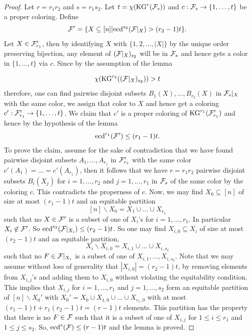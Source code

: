 \documentclass[a4paper,11pt]{article}
\begin{document}
\begin{proof} Let $r=r_1r_2$ and $s=r_1s_2$. Let $t=\chi(\mbox{KG}^r({\cal F}_s))$ and $c:{\cal F}_s\rightarrow \{1,\dots, t\}$ be a proper coloring. Define
$${\cal F}'=\{X\subseteq [n]| \mbox{ecd}^{s_2}({\cal F}|_X)>(r_2-1)t\}.$$
 Let $X\in {\cal F}'_{r_1}$, then by identifying $X$ with $\{1,2,\dots, |X|\}$ by the unique order preserving bijection, any element of $({\cal F}|_X)_{s_2}$ will be in ${\cal F}_s$ and hence gets a color in $\{1,\dots, t\}$ via $c$. Since by the assumption of the lemma

$$\chi(\mbox{KG}^{r_2}(({\cal F}|_X)_{s_2}))>t$$
therefore, one can find pairwise disjoint subsets $B_1(X),\dots, B_{r_2}(X)$ in ${\cal F}_s|_X$ with the same color, we assign that color to $X$ and hence get a coloring $c':{\cal F}'_{r_1}\rightarrow \{1,\dots, t\}$. We claim that $c'$ is a proper coloring of $\mbox{KG}^{r_1}({\cal F}'_{r_1})$ and hence by the hypothesis of the lemma
$$\mbox{ecd}^{r_1}({\cal F}')\le (r_1-1)t.$$
To prove the claim, assume for the sake of contradiction that we have found pairwise disjoint subsets $A_1,\dots, A_{r_1}$ in ${\cal F}'_{r_1}$ with the same color $c'(A_1)=\dots=c'(A_{r_1})$, then it follows that we have $r=r_1r_2$ pairwise disjoint subsets $B_i(X_j)$ for $i=1,\dots, r_2$ and $j=1,\dots, r_1$ in ${\cal F}_{s}$ of the same color by the coloring $c$. This contradicts the properness of $c$. Now, we may find $X_0\subseteq [n]$ of size at most $(r_1-1)t$ and an equitable partition
$$[n]\backslash X_0=X_1\cup \dots \cup X_{r_1}$$
such that no $X\in {\cal F}'$ is a subset of one of $X_i$'s for $i=1,\dots, r_1$. In particular $X_i\not\in {\cal F}'$. So $\mbox{ecd}^{s_2}({\cal F}|_{X_i})\le (r_2-1)t$. So one may find $X_{i,0}\subseteq X_i$ of size at most $(r_2-1)t$ and an equitable partition,
$$X_i\backslash X_{i,0}=X_{i,1}\cup \dots \cup X_{i,s_2}$$
such that no $F\in {\cal F}|_{X_i}$ is a subset of one of $X_{i,1},\dots, X_{i, s_2}$. Note that we may assume without loss of generality that $|X_{i,0}|=(r_2-1)t$, by removing elements from $X_{i,j}$'s and adding them to $X_{i,0}$ without violating the equitability condition. This implies that $X_{i,j}$ for $i=1,\dots, r_1$ and $j=1,\dots, s_2$ form an equitable partition of $[n]\backslash X_0'$ with $X_0'=X_0\cup X_{1,0}\cup\dots \cup X_{r_1,0}$ with at most $(r_1-1)t+r_1(r_2-1)t=(r-1)t$ elements. This partition has the property that there is no $F\in {\cal F}$ such that it is a subset of one of $X_{i,j}$ for $1\le i\le r_1$ and $1\le j\le s_2$. So, $\mbox{ecd}^s({\cal F})\le (r-1)t$ and the lemma is proved.
\end{proof}
\end{document}
